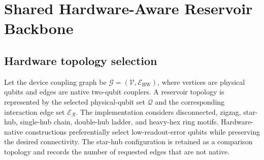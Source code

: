 \documentclass[final,1p,times]{elsarticle}
\begin{document}
\section{Shared Hardware-Aware Reservoir Backbone}
\label{sec:backbone}

\subsection{Hardware topology selection}

Let the device coupling graph be
$\mathcal G=(\mathcal V,\mathcal E_{\mathrm{HW}})$, where vertices are
physical qubits and edges are native two-qubit couplers. A reservoir
topology is represented by the selected physical-qubit set
$\mathcal Q$ and the corresponding interaction edge set
$\mathcal E_{\mathcal R}$. The implementation considers disconnected,
zigzag, star-hub, single-hub chain, double-hub ladder, and heavy-hex
ring motifs. Hardware-native constructions preferentially select
low-readout-error qubits while preserving the desired connectivity.
The star-hub configuration is retained as a comparison topology and
records the number of requested edges that are not native.
\end{document}
